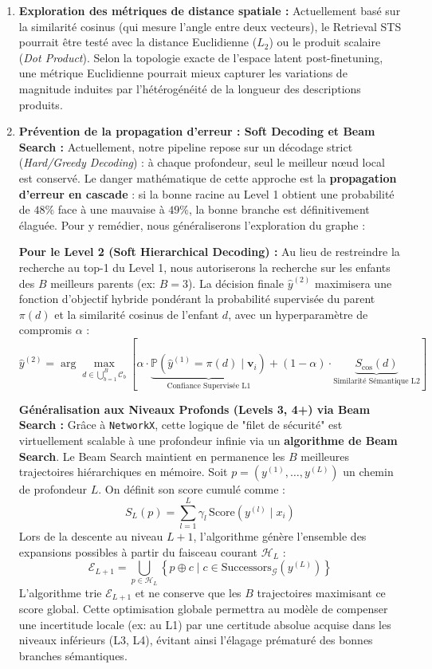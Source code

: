 \documentclass[11pt,a4paper]{article}
\begin{document}
\begin{enumerate}
    \item \textbf{Exploration des métriques de distance spatiale :} 
    Actuellement basé sur la similarité cosinus (qui mesure l'angle entre deux vecteurs), le Retrieval STS pourrait être testé avec la distance Euclidienne ($L_2$) ou le produit scalaire (\textit{Dot Product}). Selon la topologie exacte de l'espace latent post-finetuning, une métrique Euclidienne pourrait mieux capturer les variations de magnitude induites par l'hétérogénéité de la longueur des descriptions produits.
    
    \item \textbf{Prévention de la propagation d'erreur : Soft Decoding et Beam Search :} 
    Actuellement, notre pipeline repose sur un décodage strict (\textit{Hard/Greedy Decoding}) : à chaque profondeur, seul le meilleur nœud local est conservé. Le danger mathématique de cette approche est la \textbf{propagation d'erreur en cascade} : si la bonne racine au Level 1 obtient une probabilité de $48\%$ face à une mauvaise à $49\%$, la bonne branche est définitivement élaguée. Pour y remédier, nous généraliserons l'exploration du graphe :
    
    \textbf{Pour le Level 2 (Soft Hierarchical Decoding) :} 
    Au lieu de restreindre la recherche au top-1 du Level 1, nous autoriserons la recherche sur les enfants des $B$ meilleurs parents (ex: $B=3$). La décision finale $\widehat{y}^{(2)}$ maximisera une fonction d'objectif hybride pondérant la probabilité supervisée du parent $\pi(d)$ et la similarité cosinus de l'enfant $d$, avec un hyperparamètre de compromis $\alpha$ :
    \[
    \widehat{y}^{(2)} = \arg\max_{d \in \bigcup_{b=1}^B \mathcal{C}_{b}} \left[ \alpha \cdot \underbrace{\mathbb{P}(\widehat{y}^{(1)} = \pi(d) \mid \mathbf{v}_i)}_{\text{Confiance Supervisée L1}} + (1 - \alpha) \cdot \underbrace{S_{\text{cos}}(d)}_{\text{Similarité Sémantique L2}} \right]
    \]
    
    \textbf{Généralisation aux Niveaux Profonds (Levels 3, 4+) via Beam Search :}
    Grâce à \texttt{NetworkX}, cette logique de "filet de sécurité" est virtuellement scalable à une profondeur infinie via un \textbf{algorithme de Beam Search}. 
    Le Beam Search maintient en permanence les $B$ meilleures trajectoires hiérarchiques en mémoire. Soit $p = (y^{(1)}, \dots, y^{(L)})$ un chemin de profondeur $L$. On définit son score cumulé comme :
    \[
    S_L(p) = \sum_{l=1}^L \gamma_l \, \text{Score}(y^{(l)} \mid x_i)
    \]
    Lors de la descente au niveau $L+1$, l'algorithme génère l'ensemble des expansions possibles à partir du faisceau courant $\mathcal{H}_L$ : 
    \[
    \mathcal{E}_{L+1} = \bigcup_{p \in \mathcal{H}_L} \left\{ p \oplus c \mid c \in \text{Successors}_{\mathcal{G}}(y^{(L)}) \right\}
    \]
    L'algorithme trie $\mathcal{E}_{L+1}$ et ne conserve que les $B$ trajectoires maximisant ce score global. Cette optimisation globale permettra au modèle de compenser une incertitude locale (ex: au L1) par une certitude absolue acquise dans les niveaux inférieurs (L3, L4), évitant ainsi l'élagage prématuré des bonnes branches sémantiques.
\end{enumerate}
\end{document}
